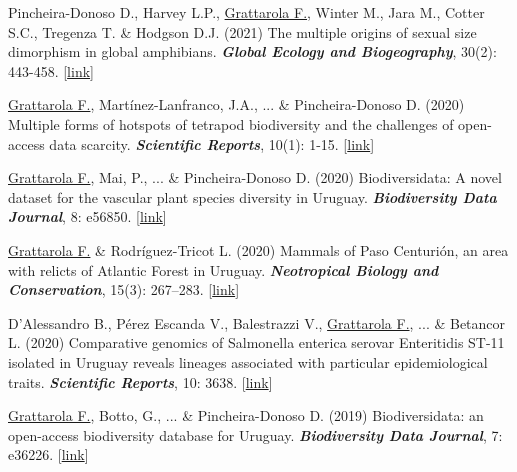 \documentclass[9pt]{developercv} %
\begin{document}


\begin{etaremune}

\item Pincheira-Donoso D., Harvey L.P., \underline{Grattarola F.}, Winter M., Jara M., Cotter S.C., Tregenza T. \& Hodgson D.J. (2021) The multiple origins of sexual size dimorphism in global amphibians. \textit{\textbf{Global Ecology and Biogeography}}, 30(2): 443-458. [\href{https://doi.org/10.1111/geb.13230}{link}]

\item \underline{Grattarola F.}, Martínez-Lanfranco, J.A., ... \& Pincheira-Donoso D. (2020) Multiple forms of hotspots of tetrapod biodiversity and the challenges of open-access data scarcity. \textit{\textbf{Scientific Reports}}, 10(1): 1-15. [\href{https://doi.org/10.1038/s41598-020-79074-8}{link}]

\item \underline{Grattarola F.}, Mai, P., ... \& Pincheira-Donoso D. (2020) Biodiversidata: A novel dataset for the vascular plant species diversity in Uruguay. \textit{\textbf{Biodiversity Data Journal}}, 8: e56850. [\href{https://doi.org/10.3897/BDJ.8.e56850}{link}]

\item \underline{Grattarola F.} \& Rodríguez-Tricot L. (2020) Mammals of Paso Centurión, an area with relicts of Atlantic Forest in Uruguay. \textit{\textbf{Neotropical Biology and Conservation}}, 15(3): 267–283. [\href{https://doi.org/10.3897/neotropical.15.e53062}{link}]

\item D’Alessandro B., Pérez Escanda V., Balestrazzi V., \underline{Grattarola F.}, ... \& Betancor L.  (2020) Comparative genomics of Salmonella enterica serovar Enteritidis ST-11 isolated in Uruguay reveals lineages associated with particular epidemiological traits. \textit{\textbf{Scientific Reports}}, 10: 3638. [\href{https://doi.org/10.1038/s41598-020-60502-8}{link}]

\item \underline{Grattarola F.}, Botto, G., ... \& Pincheira-Donoso D. (2019) Biodiversidata: an open-access biodiversity database for Uruguay. \textit{\textbf{Biodiversity Data Journal}}, 7: e36226. [\href{https://doi.org/10.3897/BDJ.7.e36226}{link}]


\end{etaremune}
\end{document}
